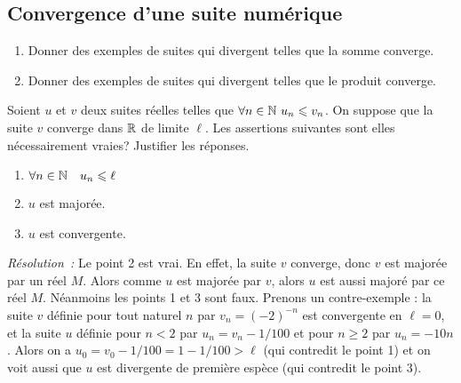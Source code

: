         \subsection{Convergence d'une suite numérique}
        \begin{exercice}
          \begin{enumerate}
            \item Donner des exemples de suites qui divergent telles que la 
              somme converge.
            \item Donner des exemples de suites qui divergent telles que le 
              produit converge.
          \end{enumerate}
        \end{exercice}
        \begin{exercice}
          Soient \(u\) et \(v\) deux suites réelles telles que \(\forall n \in 
          \mathbb{N} \ u_n \leqslant v_n\). On suppose que la suite \(v\) converge dans 
          \(\mathbb{R}\) de limite \(\ell\). Les assertions suivantes sont elles 
          nécessairement vraies? Justifier les réponses.
          \begin{enumerate}
            \item \(\forall n \in \mathbb{N} \quad u_n \leqslant \ell\)
            \item \(u\) est majorée.
            \item \(u\) est convergente.
          \end{enumerate}
        \end{exercice}
        \emph{Résolution~:}
        Le point 2 est vrai. En effet, la suite \(v\) converge, donc \(v\) est 
        majorée par un réel \(M\). Alors comme \(u\) est majorée par \(v\), 
        alors \(u\) est aussi majoré par ce réel \(M\). Néanmoins les points 1 
        et 3 sont faux. Prenons un contre-exemple : la suite \(v\) définie pour 
        tout naturel \(n\) par \(v_n = (-2)^{-n}\) est convergente en \(\ell = 
        0\), et la suite \(u\) définie pour \(n<2\) par \(u_n = v_n - 1/100\) et 
        pour \(n\geqslant 2\) par \(u_n = -10n\). Alors on a \(u_0 = v_0 - 1/100 
        = 1 - 1/100 > \ell\) (qui contredit le point 1) et on voit aussi que 
        \(u\) est divergente de première espèce (qui contredit le point 3).

